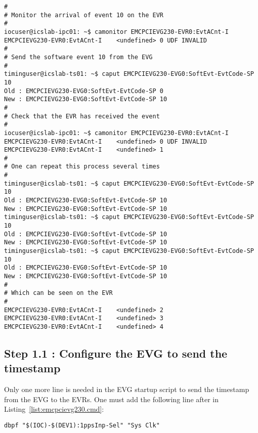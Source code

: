 \documentclass[11pt
  , a4paper
  , article
  , oneside
  , showtrims
]{memoir}
\begin{document}
\begin{lstlisting}[style=termstyle]
#
# Monitor the arrival of event 10 on the EVR
#
iocuser@icslab-ipc01: ~$ camonitor EMCPCIEVG230-EVR0:EvtACnt-I
EMCPCIEVG230-EVR0:EvtACnt-I    <undefined> 0 UDF INVALID
#
# Send the software event 10 from the EVG
#
timinguser@icslab-ts01: ~$ caput EMCPCIEVG230-EVG0:SoftEvt-EvtCode-SP 10
Old : EMCPCIEVG230-EVG0:SoftEvt-EvtCode-SP 0
New : EMCPCIEVG230-EVG0:SoftEvt-EvtCode-SP 10
#
# Check that the EVR has received the event
#
iocuser@icslab-ipc01: ~$ camonitor EMCPCIEVG230-EVR0:EvtACnt-I
EMCPCIEVG230-EVR0:EvtACnt-I    <undefined> 0 UDF INVALID
EMCPCIEVG230-EVR0:EvtACnt-I    <undefined> 1
#
# One can repeat this process several times
#
timinguser@icslab-ts01: ~$ caput EMCPCIEVG230-EVG0:SoftEvt-EvtCode-SP 10
Old : EMCPCIEVG230-EVG0:SoftEvt-EvtCode-SP 10
New : EMCPCIEVG230-EVG0:SoftEvt-EvtCode-SP 10
timinguser@icslab-ts01: ~$ caput EMCPCIEVG230-EVG0:SoftEvt-EvtCode-SP 10
Old : EMCPCIEVG230-EVG0:SoftEvt-EvtCode-SP 10
New : EMCPCIEVG230-EVG0:SoftEvt-EvtCode-SP 10
timinguser@icslab-ts01: ~$ caput EMCPCIEVG230-EVG0:SoftEvt-EvtCode-SP 10
Old : EMCPCIEVG230-EVG0:SoftEvt-EvtCode-SP 10
New : EMCPCIEVG230-EVG0:SoftEvt-EvtCode-SP 10
#
# Which can be seen on the EVR
#
EMCPCIEVG230-EVR0:EvtACnt-I    <undefined> 2
EMCPCIEVG230-EVR0:EvtACnt-I    <undefined> 3
EMCPCIEVG230-EVR0:EvtACnt-I    <undefined> 4
\end{lstlisting}

\subsection{Step 1.1 : Configure the EVG to send the timestamp}
Only one more line is needed in the EVG startup script to send the timestamp from the EVG to the EVRs. One must add the following line after  in Listing~\ref{list:emcpcievg230.cmd}:
\begin{lstlisting}[style=termstyle]
dbpf "$(IOC)-$(DEV1):1ppsInp-Sel" "Sys Clk"
\end{lstlisting}
\end{document}
